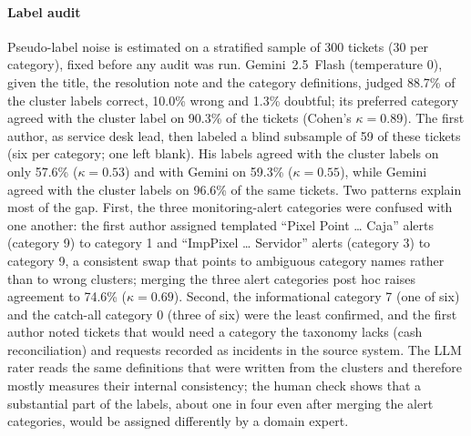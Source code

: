 \documentclass[conference]{IEEEtran}
\begin{document}
\paragraph{Label audit} Pseudo-label noise is estimated on a stratified sample of 300 tickets (30 per
category), fixed before any audit was run. Gemini~2.5~Flash (temperature 0), given the title, the resolution note
and the category definitions, judged 88.7\% of the cluster labels correct, 10.0\% wrong and 1.3\% doubtful; its
preferred category agreed with the cluster label on 90.3\% of the tickets (Cohen's $\kappa=0.89$). The first author, as
service desk lead, then labeled a blind subsample of 59 of these tickets (six per category; one left blank). His
labels agreed with the cluster labels on only 57.6\% ($\kappa=0.53$) and with Gemini on 59.3\% ($\kappa=0.55$),
while Gemini agreed with the cluster labels on 96.6\% of the same tickets. Two patterns explain most of the gap.
First, the three monitoring-alert categories were confused with one another: the first author assigned templated
``Pixel Point \ldots{} Caja'' alerts (category 9) to category 1 and ``ImpPixel \ldots{} Servidor'' alerts (category
3) to category 9, a consistent swap that points to ambiguous category names rather than to wrong clusters;
merging the three alert categories post hoc raises agreement to 74.6\% ($\kappa=0.69$). Second, the
informational category 7 (one of six) and the catch-all category 0 (three of six) were the least confirmed, and
the first author noted tickets that would need a category the taxonomy lacks (cash reconciliation) and requests
recorded as incidents in the source system. The LLM rater reads the same definitions that were written from the
clusters and therefore mostly measures their internal consistency; the human check shows that a substantial
part of the labels, about one in four even after merging the alert categories, would be assigned differently by
a domain expert.
\end{document}
